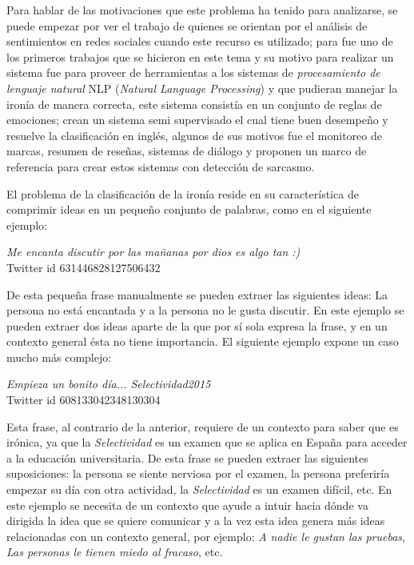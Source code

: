 \par Para hablar de las motivaciones que este problema ha tenido para analizarse, se puede empezar por ver el trabajo de \textcite{maynard2014cares} quienes se orientan por el análisis de sentimientos en redes sociales cuando este recurso es utilizado; para \textcite{utsumi1995interpret} fue uno de los primeros trabajos que se hicieron en este tema y su motivo para realizar un sistema fue para proveer de herramientas a los sistemas de \textit{procesamiento de lenguaje natural} NLP (\textit{Natural Language Processing}) y que pudieran manejar la ironía de manera correcta, este sistema consistía en un conjunto de reglas de emociones; \textcite{davidov2010semi} crean un sistema semi supervisado el cual tiene buen desempeño y resuelve la clasificación en inglés, algunos de sus motivos fue el monitoreo de marcas, resumen de reseñas, sistemas de diálogo y proponen un marco de referencia para crear estos sistemas con detección de sarcasmo.
\par El problema de la clasificación de la ironía reside en su característica de comprimir ideas en un pequeño conjunto de palabras, como en el siguiente ejemplo:

\begin{center}
	\textit{Me encanta discutir por las mañanas por dios es algo tan :)}\\[6pt]
	\footnotesize{Twitter id 631446828127506432}
\end{center}


\par De esta pequeña frase manualmente se pueden extraer las siguientes ideas: La persona no está encantada y a la persona no le gusta discutir. En este ejemplo se pueden extraer dos ideas aparte de la que por sí sola expresa la frase, y en un contexto general ésta no tiene importancia. El siguiente ejemplo expone un caso mucho más complejo:

\begin{center}
	\textit{Empieza un bonito día...  Selectividad2015}\\[6pt]
	\footnotesize{Twitter id 608133042348130304}
\end{center}


\par Esta frase, al contrario de la anterior, requiere de un contexto para saber que es irónica, ya que la \textit{Selectividad} es un examen que se aplica en España para acceder a la educación universitaria. De esta frase se pueden extraer las siguientes suposiciones: la persona se siente nerviosa por el examen, la persona preferiría empezar su día con otra actividad, la \textit{Selectividad} es un examen difícil, etc. En este ejemplo se necesita de un contexto que ayude a intuir hacia dónde va dirigida la idea que se quiere comunicar y a la vez esta idea genera más ideas relacionadas con un contexto general, por ejemplo: \textit{A nadie le gustan las pruebas}, \textit{Las personas le tienen miedo al fracaso}, etc.

